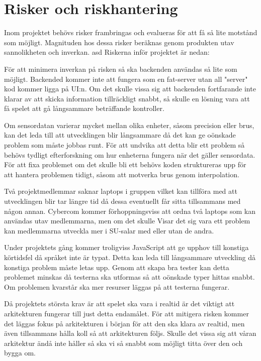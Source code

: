\section{Risker och riskhantering}
Inom projektet behövs risker frambringas och evalueras för att få så lite motstånd som möjligt. 
Magnituden hos dessa risker beräknas genom produkten utav sannolikheten och inverkan. asd
Riskerna inför projektet är nedan:

{
    För att minimera inverkan på risken så ska backenden användas så lite som möjligt.
    Backended kommer inte att fungera som en fat-server utan all "server" kod kommer ligga på UI:n. 
    Om det skulle vissa sig att backenden fortfarande inte klarar av att skicka information tillräckligt snabbt, 
    så skulle en lösning vara att få spelet att gå långsammare beträffande kontroller.
}

{
    Om sensordatan varierar mycket mellan olika enheter, såsom precision eller brus,
    kan det leda till att utvecklingen blir långsammare då det kan ge oönskade problem som måste jobbas runt.
    För att undvika att detta blir ett problem så behövs tydligt efterforskning om hur enheterna fungera när
    det gäller sensordata. För att fixa problemet om det skulle bli ett behövs koden struktureras upp för att
    hantera problemen tidigt, såsom att motverka brus genom interpolation.
}

{
    Två projektmedlemmar saknar laptops i gruppen vilket kan tillföra med att utvecklingen blir tar längre tid
    då dessa eventuellt får sitta tillsammans med någon annan.
    Cybercom kommer förhoppningsviss att ordna två laptops som kan användas utav medlemmarna, men om det skulle
    Visar det sig vara ett problem kan medlemmarna utveckla mer i SU-salar med eller utan de andra.
}

{
    Under projektets gång kommer troligviss JavaScript att ge upphov till konstiga körtidsfel då språket inte är typat.
    Detta kan leda till långsammare utveckling då konstiga problem måste letas upp.
    Genom att skapa bra tester kan detta problemet minskas då testerna ska utformas så att oönskade typer hittas snabbt.
    Om problemen kvarstår ska mer resurser läggas på att testerna fungerar.
}

{
    Då projektets största krav är att spelet ska vara i realtid är det viktigt att arkitekturen fungerar till just
    detta endamålet.
    För att mitigera risken kommer det läggas fokus på arkitekturen i början för att den ska klara av realtid, 
    men även tillsammans hålla koll så att arkitekturen följs.
    Skulle det vissa sig att våran arkitektur ändå inte håller så ska vi så snabbt som möjligt titta över den och bygga om.
}

